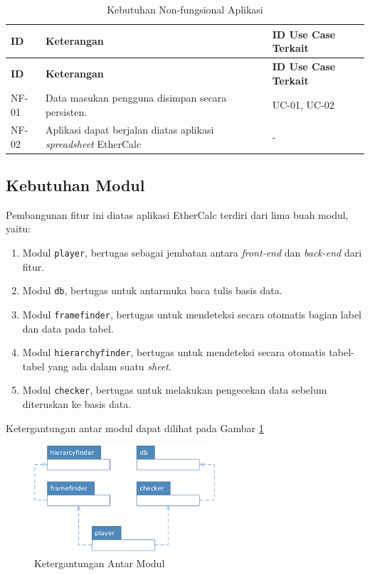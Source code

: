 	\begin{longtable}{ | p{2cm} | p{6cm} | p{4cm} | }
	    \caption{Kebutuhan Non-fungsional Aplikasi}
	    \label{KebutuhanNonfungsional}\\ \hline
	    \centering\bfseries{ID} & \centering\bfseries{Keterangan} & \centering\bfseries{ID Use Case Terkait} \tabularnewline \hline
	    \endfirsthead
	    \hline
	    \centering\bfseries{ID} & \centering\bfseries{Keterangan} & \centering\bfseries{ID Use Case Terkait} \tabularnewline \hline
	    \endhead
	    NF-01 & Data masukan pengguna disimpan secara persisten. & UC-01, UC-02 \\ \hline
	    NF-02 & Aplikasi dapat berjalan diatas aplikasi \textit{spreadsheet} EtherCalc & - \\ \hline
	\end{longtable}

	\subsection{Kebutuhan Modul} \label{KebutuhanModul}
	Pembangunan fitur ini diatas aplikasi EtherCalc terdiri dari lima buah modul, yaitu:
	\begin{enumerate}
		\item Modul \texttt{player}, bertugas sebagai jembatan antara \textit{front-end} dan \textit{back-end} dari fitur.
		\item Modul \texttt{db}, bertugas untuk antarmuka baca tulis basis data.
		\item Modul \texttt{framefinder}, bertugas untuk mendeteksi secara otomatis bagian label dan data pada tabel.
		\item Modul \texttt{hierarchyfinder}, bertugas untuk mendeteksi secara otomatis tabel-tabel yang ada dalam suatu \textit{sheet}.
		\item Modul \texttt{checker}, bertugas untuk melakukan pengecekan data sebelum diteruskan ke basis data.
	\end{enumerate}

	Ketergantungan antar modul dapat dilihat pada Gambar \ref{ModuleDependency}

	\begin{figure}[htb]
	    \centering
	    \includegraphics[width=0.6\textwidth]{resources/chapter-4-module-dependecy.png}
	    \caption{Ketergantungan Antar Modul}
		\label{ModuleDependency}
	\end{figure}

